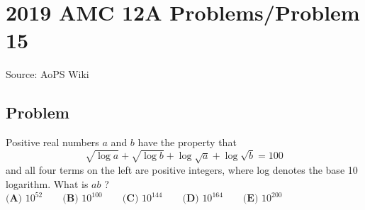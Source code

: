 \documentclass[12pt]{article}
\begin{document}
\section*{{2019 AMC 12A Problems/Problem 15}}
Source: AoPS Wiki

\subsection*{Problem}
Positive real numbers $a$ and $b$ have the property that \[\sqrt{\log{a}} + \sqrt{\log{b}} + \log \sqrt{a} + \log \sqrt{b} = 100\] and all four terms on the left are positive integers, where log denotes the base 10 logarithm. What is $ab$ ? $\textbf{(A) } 10^{52} \qquad \textbf{(B) } 10^{100} \qquad \textbf{(C) } 10^{144} \qquad \textbf{(D) } 10^{164} \qquad \textbf{(E) } 10^{200}$
\end{document}
